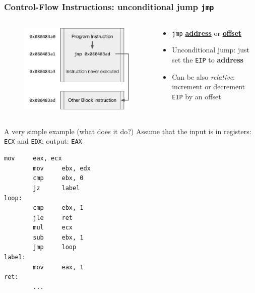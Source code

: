 \documentclass[]{beamer}
\begin{document}
\begin{frame}
  \frametitle{Control-Flow Instructions: unconditional jump {\tt jmp}}
  \begin{columns}
    \begin{column}{0.4\columnwidth}
      \begin{figure}
        \includegraphics[width=1.1\textwidth]{images/x86-jmp.pdf}

        \label{Control Flow JMP}
      \end{figure}
    \end{column}
    \begin{column}{0.6\columnwidth}
      \begin{itemize}
	      \item{{\tt jmp} \underline{\textbf{address}} or \underline{\textbf{offset}}}\\
	      \item Unconditional jump: just set the {\tt EIP} to \textbf{address}
	      \item Can be also \emph{relative}: increment or decrement {\tt EIP} by an offset
      \end{itemize}
    \end{column}
  \end{columns}
\end{frame}

\begin{frame}[fragile]{A very simple example (what does it do?)}
Assume that the input is in registers: {\tt ECX} and {\tt EDX}; output: {\tt EAX}
\begin{lstlisting}[language={[x86masm]Assembler}]
        mov     eax, ecx
        mov     ebx, edx
        cmp     ebx, 0
        jz      label
loop:
        cmp     ebx, 1
        jle     ret
        mul     ecx
        sub     ebx, 1
        jmp     loop
label:
        mov     eax, 1
ret:
        ...
\end{lstlisting}
\end{frame}
\end{document}
